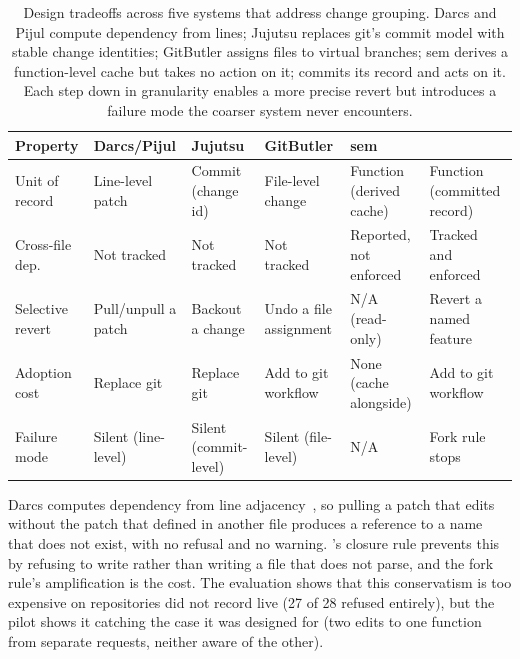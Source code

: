 \begin{table}[t]
\centering
\small
\begin{tabular}{p{1.8cm}p{2.1cm}p{2.1cm}p{2.1cm}p{2.1cm}p{2.1cm}}
\toprule
Property & \textbf{Darcs/Pijul} & \textbf{Jujutsu} & \textbf{GitButler} & \textbf{sem} & \textbf{\sgt{}} \\
\midrule
Unit of record & Line-level patch & Commit (change id) & File-level change & Function (derived cache) & Function (committed record) \\
Cross-file dep. & Not tracked & Not tracked & Not tracked & Reported, not enforced & Tracked and enforced \\
Selective revert & Pull/unpull a patch & Backout a change & Undo a file assignment & N/A (read-only) & Revert a named feature \\
Adoption cost & Replace git & Replace git & Add to git workflow & None (cache alongside) & Add to git workflow \\
Failure mode & Silent (line-level) & Silent (commit-level) & Silent (file-level) & N/A & Fork rule stops \\
\bottomrule
\end{tabular}
\caption{Design tradeoffs across five systems that address change grouping.
Darcs and Pijul compute dependency from lines; Jujutsu replaces git's commit
model with stable change identities; GitButler assigns files to virtual branches;
sem derives a function-level cache but takes no action on it; \sgt{} commits its
record and acts on it. Each step down in granularity enables a more precise
revert but introduces a failure mode the coarser system never encounters.}
\label{tab:comparison}
\end{table}

Darcs computes dependency from line adjacency~\cite{roundy2005}, so pulling a
patch that edits  without the patch that defined
 in another file produces a reference to a name that does not exist,
with no refusal and no warning. \sgt{}'s closure rule prevents this by refusing to write rather than writing a
file that does not parse, and the fork rule's amplification is the cost. The
evaluation shows that this conservatism is too expensive on repositories \sgt{}
did not record live (27 of 28 refused entirely), but the pilot shows it catching
the case it was designed for (two edits to one function from separate requests,
neither aware of the other).


